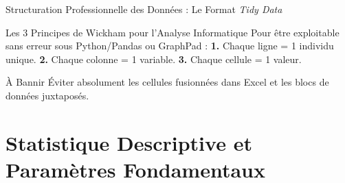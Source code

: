 \documentclass[aspectratio=169,10pt]{beamer}
\begin{document}
\begin{frame}{Structuration Professionnelle des Données : Le Format \textit{Tidy Data}}
  \begin{conceptbox}{Les 3 Principes de Wickham pour l'Analyse Informatique}
    Pour être exploitable sans erreur sous Python/Pandas ou GraphPad :
    \textbf{1.} Chaque ligne = 1 individu unique. \textbf{2.} Chaque colonne = 1 variable. \textbf{3.} Chaque cellule = 1 valeur.
  \end{conceptbox}
  \vspace{1.5mm}
  \begin{center}
  \end{center}
  \vspace{1mm}
  \begin{takeawaybox}{À Bannir}
    Éviter absolument les cellules fusionnées dans Excel et les blocs de données juxtaposés.
  \end{takeawaybox}
\end{frame}

\section{Statistique Descriptive et Paramètres Fondamentaux}
\end{document}
